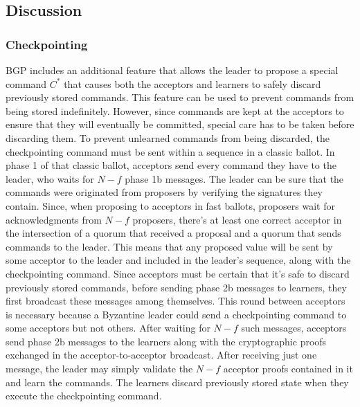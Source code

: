 \subsection{Discussion}
\subsubsection{Checkpointing} BGP includes an additional feature that allows the leader to propose a special command $C^*$ that causes both the acceptors and learners to safely discard previously stored commands. This feature can be used to prevent commands from being stored indefinitely. However, since commands are kept at the acceptors to ensure that they will eventually be committed, special care has to be taken before discarding them. To prevent unlearned commands from being discarded, the checkpointing command must be sent within a sequence in a classic ballot. In phase 1 of that classic ballot, acceptors send every command they have to the leader, who waits for $N-f$ phase 1b messages. The leader can be sure that the commands were originated from proposers by verifying the signatures they contain. Since, when proposing to acceptors in fast ballots, proposers wait for acknowledgments from $N-f$ proposers, there's at least one correct acceptor in the intersection of a quorum that received a proposal and a quorum that sends commands to the leader. This means that any proposed value will be sent by some acceptor to the leader and included in the leader's sequence, along with the checkpointing command. Since acceptors must be certain that it's safe to discard previously stored commands, before sending phase 2b messages to learners, they first broadcast these messages among themselves. This round between acceptors is necessary because a Byzantine leader could send a checkpointing command to some acceptors but not others. After waiting for $N-f$ such messages, acceptors send phase 2b messages to the learners along with the cryptographic proofs exchanged in the acceptor-to-acceptor broadcast. After receiving just one message, the leader may simply validate the $N-f$ acceptor proofs contained in it and learn the commands. The learners discard previously stored state when they execute the checkpointing command.\par

